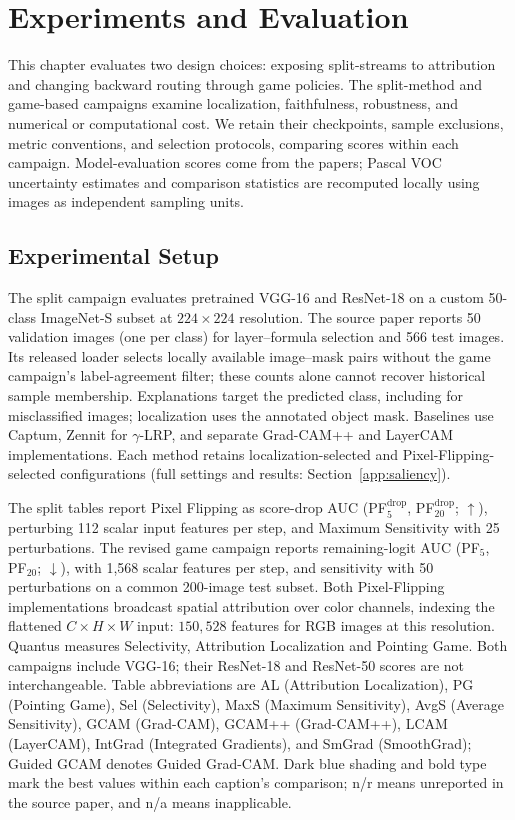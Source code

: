 \chapter{Experiments and Evaluation}\label{ch:experiments}

This chapter evaluates two design choices: exposing split-streams to attribution and changing backward routing through game policies. The split-method and game-based campaigns examine localization, faithfulness, robustness, and numerical or computational cost. We retain their checkpoints, sample exclusions, metric conventions, and selection protocols, comparing scores within each campaign. Model-evaluation scores come from the papers; Pascal VOC uncertainty estimates and comparison statistics are recomputed locally using images as independent sampling units.

\section{Experimental Setup}\label{sec:experimental_setup}\label{sec:quantus_evaluation}

The split campaign evaluates pretrained VGG-16 and ResNet-18 on a custom 50-class ImageNet-S subset at $224\times224$ resolution. The source paper reports 50 validation images (one per class) for layer--formula selection and 566 test images. Its released loader selects locally available image--mask pairs without the game campaign's label-agreement filter; these counts alone cannot recover historical sample membership. Explanations target the predicted class, including for misclassified images; localization uses the annotated object mask. Baselines use Captum, Zennit for $\gamma$-LRP, and separate Grad-CAM++ and LayerCAM implementations. Each method retains localization-selected and Pixel-Flipping-selected configurations (full settings and results: Section~\ref{app:saliency}).

The split tables report Pixel Flipping as score-drop AUC (PF$^{\mathrm{drop}}_5$, PF$^{\mathrm{drop}}_{20}$; $\uparrow$), perturbing 112 scalar input features per step, and Maximum Sensitivity with 25 perturbations. The revised game campaign reports remaining-logit AUC (PF$_5$, PF$_{20}$; $\downarrow$), with 1,568 scalar features per step, and sensitivity with 50 perturbations on a common 200-image test subset. Both Pixel-Flipping implementations broadcast spatial attribution over color channels, indexing the flattened $C\times H\times W$ input: $150{,}528$ features for RGB images at this resolution. Quantus measures Selectivity, Attribution Localization and Pointing Game. Both campaigns include VGG-16; their ResNet-18 and ResNet-50 scores are not interchangeable. Table abbreviations are AL (Attribution Localization), PG (Pointing Game), Sel (Selectivity), MaxS (Maximum Sensitivity), AvgS (Average Sensitivity), GCAM (Grad-CAM), GCAM++ (Grad-CAM++), LCAM (LayerCAM), IntGrad (Integrated Gradients), and SmGrad (SmoothGrad); Guided GCAM denotes Guided Grad-CAM. Dark blue shading and bold type mark the best values within each caption's comparison; n/r means unreported in the source paper, and n/a means inapplicable.

